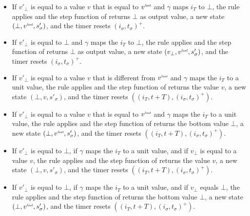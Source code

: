 \begin{skippableproof}
\begin{itemize}
        \item If $v'_\bot$ is equal to a value $v$ that is equal to $v^{\textit{\tiny last}}$ and $\gamma$ maps
              $i_T$ to $\bot$, the rule 
              applies and the step function of  returns $\bot$ as output value, a
              new state $(\bot, v^{\textit{\tiny last}}, s'_\sigma)$, and the timer resets
              $(i_\sigma, t_\sigma)^+$.

        \item If $v'_\bot$ is equal to $\bot$ and $\gamma$ maps the $i_T$ to $\bot$, the rule
               applies and the
              step function of  returns $\bot$ as output value, a new state
              $(v_\bot, v^{\textit{\tiny last}}, s'_\sigma)$, and the timer resets $(i_\sigma, t_\sigma)^+$.

        \item If $v'_\bot$ is equal to a value $v$ that is different from $v^{\textit{\tiny last}}$ and $\gamma$
              maps the $i_T$ to a unit value, the rule
               applies and the step
              function of  returns the value $v$, a new state
              $(\bot, v, s'_\sigma)$, and the timer resets $((i_T, t + T), (i_\sigma, t_\sigma)^+)$.

        \item If $v'_\bot$ is equal to a value $v$ that is equal to $v^{\textit{\tiny last}}$ and $\gamma$ maps
              the $i_T$ to a unit value, the rule
               applies and the step
              function of  returns the bottom value $\bot$, a new state
              $(\bot, v^{\textit{\tiny last}}, s'_\sigma)$, and the timer resets $((i_T, t + T),
                  (i_\sigma, t_\sigma)^+)$.

        \item If $v'_\bot$ is equal to $\bot$, if $\gamma$ maps the $i_T$ to a unit value, and if
              $v_\bot$ is equal to a value $v$, the rule
               applies and the step function
              of  returns the value $v$, a new state $(\bot, v, s'_\sigma)$, and the
              timer resets $((i_T, t + T), (i_\sigma, t_\sigma)^+)$.

        \item If $v'_\bot$ is equal to $\bot$, if $\gamma$ maps the $i_T$ to a unit value, and if
              $v_\bot$ equals $\bot$, the rule 
              applies and the step function of  returns the bottom value $\bot$, a
              new state $(\bot, v^{\textit{\tiny last}}, s'_\sigma)$, and the timer resets $((i_T, t + T),
                  (i_\sigma, t_\sigma)^+)$.
    \end{itemize}


\end{skippableproof}
